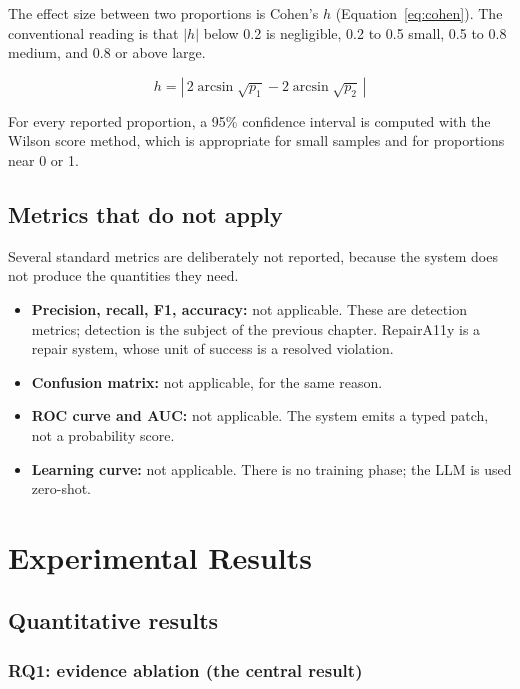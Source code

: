 \documentclass[11pt]{article}
\begin{document}
The effect size between two proportions is Cohen's $h$ (Equation~\ref{eq:cohen}). The
conventional reading is that $\lvert h \rvert$ below 0.2 is negligible, 0.2 to 0.5
small, 0.5 to 0.8 medium, and 0.8 or above large.

\begin{equation}
\label{eq:cohen}
h = \left\lvert\, 2\arcsin\!\sqrt{p_1} - 2\arcsin\!\sqrt{p_2} \,\right\rvert
\end{equation}

For every reported proportion, a 95\% confidence interval is computed with the Wilson
score method, which is appropriate for small samples and for proportions near 0 or 1.

\subsection{Metrics that do not apply}

Several standard metrics are deliberately not reported, because the system does not
produce the quantities they need.

\begin{itemize}
  \item \textbf{Precision, recall, F1, accuracy:} not applicable. These are detection
    metrics; detection is the subject of the previous chapter. RepairA11y is a repair
    system, whose unit of success is a resolved violation.
  \item \textbf{Confusion matrix:} not applicable, for the same reason.
  \item \textbf{ROC curve and AUC:} not applicable. The system emits a typed patch,
    not a probability score.
  \item \textbf{Learning curve:} not applicable. There is no training phase; the LLM
    is used zero-shot.
\end{itemize}

\section{Experimental Results}

\subsection{Quantitative results}

\subsubsection{RQ1: evidence ablation (the central result)}
\end{document}
